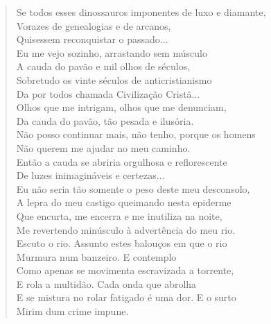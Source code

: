 \begin{verse}
Se todos esses dinossauros imponentes de luxo e diamante,\\
Vorazes de genealogias e de arcanos,\\
Quisessem reconquistar o passado...\\
Eu me vejo sozinho, arrastando sem músculo\\
A cauda do pavão e mil olhos de séculos,\\
Sobretudo os vinte séculos de anticristianismo\\
Da por todos chamada Civilização Cristã...\\
Olhos que me intrigam, olhos que me denunciam,\\
Da cauda do pavão, tão pesada e ilusória.\\
Não posso continuar mais, não tenho, porque os homens\\
Não querem me ajudar no meu caminho.\\
Então a cauda se abriria orgulhosa e reflorescente\\
De luzes inimagináveis e certezas...\\
Eu não seria tão somente o peso deste meu desconsolo,\\
A lepra do meu castigo queimando nesta epiderme\\
Que encurta, me encerra e me inutiliza na noite,\\
Me revertendo minúsculo à advertência do meu rio.\\
Escuto o rio. Assunto estes balouços em que o rio\\
Murmura num banzeiro. E contemplo\\
Como apenas se movimenta escravizada a torrente,\\
E rola a multidão. Cada onda que abrolha\\
E se mistura no rolar fatigado é uma dor. E o surto\\
Mirim dum crime impune.


\end{verse}

